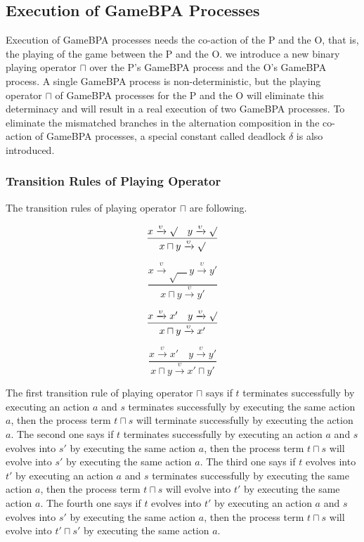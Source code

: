 \documentclass{fac}
\begin{document}
\subsection{Execution of GameBPA Processes}

Execution of GameBPA processes needs the co-action of the P and the O, that is, the playing of the game between the P and the O. we introduce a new binary playing operator $\sqcap$ over the P's GameBPA process and the O's GameBPA process. A single GameBPA process is non-deterministic, but the playing operator $\sqcap$ of GameBPA processes for the P and the O will eliminate this determinacy and will result in a real execution of two GameBPA processes. To eliminate the mismatched branches in the alternation composition in the co-action of GameBPA processes, a special constant called deadlock $\delta$ is also introduced.

\subsubsection{Transition Rules of Playing Operator}

The transition rules of playing operator $\sqcap$ are following.

$$
\frac{x\xrightarrow{\upsilon}\surd \quad y\xrightarrow{\upsilon}\surd}{x\sqcap y\xrightarrow{\upsilon}\surd}
$$

$$
\frac{x\xrightarrow{\upsilon}\surd \quad y\xrightarrow{\upsilon}y'}{x\sqcap y\xrightarrow{\upsilon}y'}
$$

$$
\frac{x\xrightarrow{\upsilon}x' \quad y\xrightarrow{\upsilon}\surd}{x\sqcap y\xrightarrow{\upsilon}x'}
$$

$$
\frac{x\xrightarrow{\upsilon}x' \quad y\xrightarrow{\upsilon}y'}{x\sqcap y\xrightarrow{\upsilon}x'\sqcap y'}
$$

The first transition rule of playing operator $\sqcap$ says if $t$ terminates successfully by executing an action $a$ and $s$ terminates successfully by executing the same action $a$, then the process term $t \sqcap s$ will terminate successfully by executing the action $a$. The second one says if $t$ terminates successfully by executing an action $a$ and $s$ evolves into $s'$ by executing the same action $a$, then the process term $t \sqcap s$ will evolve into $s'$ by executing the same action $a$. The third one says if $t$ evolves into $t'$ by executing an action $a$ and $s$ terminates successfully by executing the same action $a$, then the process term $t \sqcap s$ will evolve into $t'$ by executing the same action $a$. The fourth one says if $t$ evolves into $t'$ by executing an action $a$ and $s$ evolves into $s'$ by executing the same action $a$, then the process term $t \sqcap s$ will evolve into $t' \sqcap s'$ by executing the same action $a$.
\end{document}
